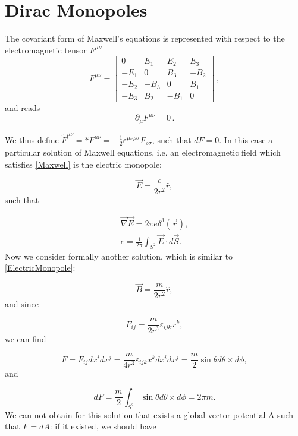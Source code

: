 \section{Dirac Monopoles}
The covariant form of Maxwell's equations is represented with respect to  the electromagnetic tensor $F^{\mu \nu}$
%
\begin{equation}
  F^{\mu\nu} = \begin{bmatrix}
  0   & E_1  & E_2  & E_3 \\
  -E_1   & 0  & B_3  & -B_2 \\
  -E_2   & -B_3  & 0  & B_1 \\
  -E_3   & B_2  & -B_1  & 0
  \end{bmatrix}\,,
\end{equation}
%
and reads
\begin{equation}\label{Maxwell}
\partial_{\mu}F^{\mu \nu}=0\,.
\end{equation}

We thus define
$\tilde{F}^{\mu\nu}=*F^{\mu\nu}=-\frac{1}{2}\varepsilon^{\mu \nu \rho \sigma}F_{\rho \sigma}$,
such that $dF=0$.
In this case a particular solution of Maxwell equations, i.e. an electromagnetic field which satisfies \eqref{Maxwell} is the electric monopole:

\begin{equation}\label{ElectricMonopole}
\vec E=\frac{e}{2r^2}\hat{r},
\end{equation}
such that

\begin{align}
\vec \nabla \vec E=2\pi e \delta^3(\vec r),\\
e=\frac{1}{2\pi}\int_{S^2}\vec E \cdot d\vec S.
\end{align}
Now we consider formally another solution, which is similar to \eqref{ElectricMonopole}:

\begin{equation}\label{MagneticMonopole}
\vec B=\frac{m}{2r^2}\hat{r},
\end{equation}
and since

\begin{equation}
F_{ij}=\frac{m}{2r^3}\varepsilon_{ijk}x^k,
\end{equation}
we can find

\begin{equation}
F=F_{ij}dx^idx^j=\frac{m}{4r^3}\varepsilon_{ijk}x^kdx^idx^j=\frac{m}{2}\sin\theta d\theta\times d\phi,
\end{equation}
and

\begin{equation}
dF=\frac{m}{2}\int_{S^2}\sin\theta d\theta\times d\phi=2\pi m.
\end{equation}
We can not obtain for this solution that exists a global vector potential A such that $F=dA$: if it existed, we should have

